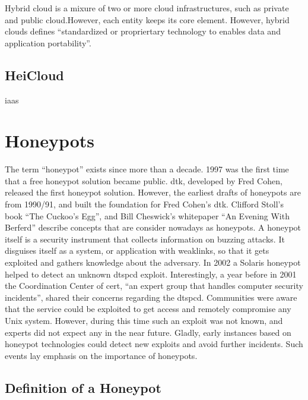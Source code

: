 Hybrid cloud is a mixure of two or more cloud infrastructures, such as private and public cloud.However, each entity keeps its core element. However, hybrid clouds defines \enquote{standardized or propriertary technology to enables data and application portability}\cite{Mell2011}.\\

\subsection{HeiCloud}

\ac{iaas}

\section{Honeypots}

The term \enquote{honeypot} exists since more than a decade. 1997 was the first time that a free honeypot solution became public. \ac{dtk}, developed by Fred Cohen, released the first honeypot solution. However, the earliest drafts of honeypots are from 1990/91, and built the foundation for Fred Cohen's \ac*{dtk}. Clifford Stoll's book \enquote{The Cuckoo's Egg}\cite{stroll2000}, and Bill Cheswick's whitepaper \enquote{An Evening With Berferd}\cite{Cheswick92} describe concepts that are consider nowadays as honeypots.\cite{Spitzner2003} A honeypot itself is a security instrument that collects information on buzzing attacks. It disguises itself as a system, or application with weaklinks, so that it gets exploited and gathers knowledge about the adversary. In 2002 a Solaris honeypot helped to detect an unknown dtspcd exploit. Interestingly, a year before in 2001 the Coordination Center of \ac{cert}, \enquote{an expert group that handles computer security incidents}, shared their concerns regarding the dtspcd. Communities were aware that the service could be exploited to get access and remotely compromise any Unix system. However, during this time such an exploit was not known, and experts did not expect any in the near future. Gladly, early instances based on honeypot technologies could detect new exploits and avoid further incidents. Such events lay emphasis on the importance of honeypots.

\subsection{Definition of a Honeypot}

